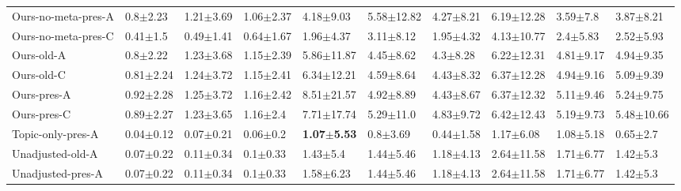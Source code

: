 \begin{tabular}{llllllllll}
Ours-no-meta-pres-A &   0.8$\pm$2.23 &  1.21$\pm$3.69 &  1.06$\pm$2.37 &           4.18$\pm$9.03 &        5.58$\pm$12.82 &         4.27$\pm$8.21 &  6.19$\pm$12.28 &   3.59$\pm$7.8 &   3.87$\pm$8.21 \\
Ours-no-meta-pres-C &   0.41$\pm$1.5 &  0.49$\pm$1.41 &  0.64$\pm$1.67 &           1.96$\pm$4.37 &         3.11$\pm$8.12 &         1.95$\pm$4.32 &  4.13$\pm$10.77 &   2.4$\pm$5.83 &   2.52$\pm$5.93 \\
Ours-old-A          &   0.8$\pm$2.22 &  1.23$\pm$3.68 &  1.15$\pm$2.39 &          5.86$\pm$11.87 &         4.45$\pm$8.62 &          4.3$\pm$8.28 &  6.22$\pm$12.31 &  4.81$\pm$9.17 &   4.94$\pm$9.35 \\
Ours-old-C          &  0.81$\pm$2.24 &  1.24$\pm$3.72 &  1.15$\pm$2.41 &          6.34$\pm$12.21 &         4.59$\pm$8.64 &         4.43$\pm$8.32 &  6.37$\pm$12.28 &  4.94$\pm$9.16 &   5.09$\pm$9.39 \\
Ours-pres-A         &  0.92$\pm$2.28 &  1.25$\pm$3.72 &  1.16$\pm$2.42 &          8.51$\pm$21.57 &         4.92$\pm$8.89 &         4.43$\pm$8.67 &  6.37$\pm$12.32 &  5.11$\pm$9.46 &   5.24$\pm$9.75 \\
Ours-pres-C         &  0.89$\pm$2.27 &  1.23$\pm$3.65 &   1.16$\pm$2.4 &          7.71$\pm$17.74 &         5.29$\pm$11.0 &         4.83$\pm$9.72 &  6.42$\pm$12.43 &  5.19$\pm$9.73 &  5.48$\pm$10.66 \\
Topic-only-pres-A   &  0.04$\pm$0.12 &  0.07$\pm$0.21 &   0.06$\pm$0.2 &  \textbf{1.07$\pm$5.53} &          0.8$\pm$3.69 &         0.44$\pm$1.58 &   1.17$\pm$6.08 &  1.08$\pm$5.18 &    0.65$\pm$2.7 \\
Unadjusted-old-A    &  0.07$\pm$0.22 &  0.11$\pm$0.34 &   0.1$\pm$0.33 &            1.43$\pm$5.4 &         1.44$\pm$5.46 &         1.18$\pm$4.13 &  2.64$\pm$11.58 &  1.71$\pm$6.77 &    1.42$\pm$5.3 \\
Unadjusted-pres-A   &  0.07$\pm$0.22 &  0.11$\pm$0.34 &   0.1$\pm$0.33 &           1.58$\pm$6.23 &         1.44$\pm$5.46 &         1.18$\pm$4.13 &  2.64$\pm$11.58 &  1.71$\pm$6.77 &    1.42$\pm$5.3 \\
\bottomrule
\end{tabular}
